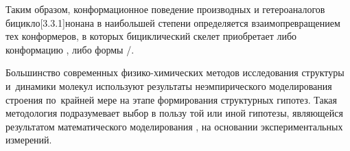 Таким образом, конформационное поведение производных и гетероаналогов бицикло[3.3.1]нонана в наибольшей степени определяется взаимопревращением тех конформеров, в которых бициклический скелет приобретает либо конформацию \CC{}, либо формы \BC{}/\CB{}.

Большинство современных физико-химических методов исследования структуры и~динамики молекул используют результаты неэмпирического моделирования строения по~крайней мере на этапе формирования структурных гипотез. Такая методология подразумевает выбор в пользу той или иной гипотезы, являющейся результатом математического моделирования , на основании экспериментальных измерений.